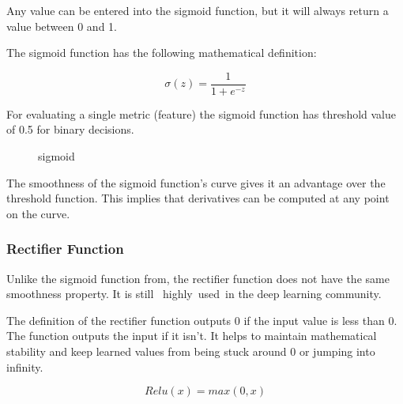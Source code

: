 Any value can be entered into the sigmoid function, but it will always return a value between 0 and 1.

The sigmoid function has the following mathematical definition:

\begin{equation}
	\sigma(z) = \frac{1} {1 + e^{-z}}
\end{equation}

For evaluating a single metric (feature) the sigmoid function has threshold value of 0.5 for binary decisions. 

\begin{figure}[htp]
	\centering
{}
\label{sigmoid function}
\caption{sigmoid}
\end{figure}

The smoothness of the sigmoid function's curve gives it an advantage over the threshold function. This implies that derivatives can be computed at any point on the curve.


\subsubsection*{Rectifier  Function}
Unlike the sigmoid function from, the rectifier function does not have the same smoothness property. It is still  highly used in the deep learning community.

The definition of the rectifier function outputs 0 if the input value is less than 0. The function outputs the input if it isn't. It helps to maintain mathematical stability and keep learned values from being stuck around 0 or jumping into infinity.



\begin{equation}
	Relu(x) = max(0, x)
\end{equation}
\begin{figure}[htp]
	\centering
{}
\end{figure}


